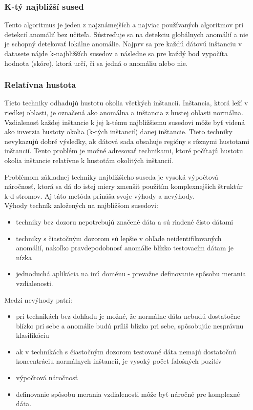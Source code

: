 \subsubsection{K-tý najbližší sused}
Tento algoritmus je jeden z najznámejších a najviac používaných algoritmov pri detekcií anomálií
bez učiteľa. Sústreďuje sa na detekciu globálnych anomálií a nie je schopný detekovať
lokálne anomálie. Najprv sa pre každú dátovú inštanciu v datasete nájde k-najbližších
susedov a následne sa pre každý bod vypočíta hodnota (skóre), ktorá určí, či sa jedná
o anomáliu alebo nie.\cite{Chandola}
\subsubsection{Relatívna hustota}
Tieto techniky odhadujú
hustotu okolia všetkých inštancií. Inštancia, ktorá leží v riedkej oblasti, je
označená ako anomálna a inštancia z hustej oblasti normálna. Vzdialenosť
každej inštancie k jej k-tému najbližšiemu susedovi môže byť videná ako
inverzia hustoty okolia (k-tých inštancií) danej inštancie.
Tieto techniky nevykazujú dobré výsledky, ak dátová sada obsahuje
regióny s rôznymi hustotami inštancií. Tento problém je možné adresovať
technikami, ktoré počítajú hustotu okolia inštancie relatívne k hustotám okolitých inštancií.\cite{Chandola}\par
Problémom základnej techniky najbližšieho suseda je vysoká výpočtová náročnosť, ktorá sa dá do istej miery zmenšiť použitím komplexnejších štruktúr k-d stromov. Aj táto metóda prináša svoje výhody a nevýhody.\\
Výhody techník založených na najbližšom susedovi:
\begin{itemize}
    \item techniky bez dozoru nepotrebujú značené dáta a sú riadené čisto dátami
    \item techniky s čiastočným dozorom sú lepšie v ohľade neidentifikovaných anomálií, nakoľko pravdepodobnosť anomálie blízko testovacím dátam je nízka
    \item jednoduchá aplikácia na inú doménu - prevažne definovanie spôsobu merania
vzdialenosti.
\end{itemize}
Medzi nevýhody patrí:
\begin{itemize}
    \item pri technikách  bez dohľadu je možné, že normálne dáta nebudú
dostatočne blízko pri sebe a anomálie budú príliš blízko pri sebe, spôsobujúc
nesprávnu klasifikáciu
\item ak v technikách s čiastočným dozorom testované dáta nemajú dostatočnú
koncentráciu normálnych inštancii, je vysoký počet falošných pozitív
\item výpočtová náročnosť
\item definovanie spôsobu merania vzdialenosti môže byť náročné pre komplexné
dáta.
\end{itemize}


